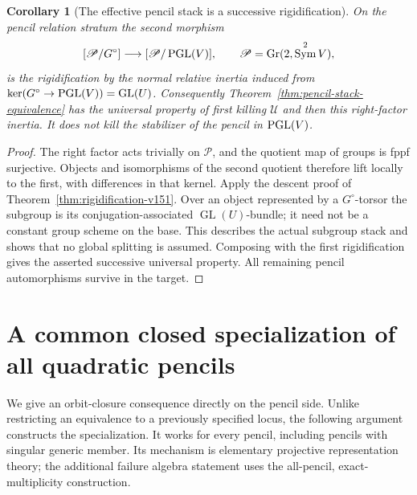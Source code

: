 \documentclass[11pt,reqno]{amsart}
\numberwithin{equation}{section}
\newtheorem{corollary}[theorem]{Corollary}
\theoremstyle{definition}\newtheorem{definition}[theorem]{Definition}
\theoremstyle{remark}\newtheorem{remark}[theorem]{Remark}
\DeclareMathOperator{\Sym}{Sym}\DeclareMathOperator{\Gr}{Gr}
\begin{document}
\begin{corollary}[The effective pencil stack is a successive rigidification]
\label{cor:two-rigidifications-v151}
On the pencil relation stratum the second morphism
\[
 [\mathscr P/G^\circ]\longrightarrow[\mathscr P/\PGL(V)],
                     \qquad \mathscr P=\Gr(2,\Sym^2V),
\]
is the rigidification by the normal relative inertia induced from
\(\ker(G^\circ\to\operatorname{PGL}(V))=\operatorname{GL}(U)\).
Consequently Theorem~\ref{thm:pencil-stack-equivalence} has the
universal property of first killing \(\mathscr U\) and then this
right-factor inertia.  It does not kill the stabilizer of the pencil
in \(\operatorname{PGL}(V)\).
\end{corollary}
\begin{proof}
The right factor acts trivially on \(\mathscr P\), and the quotient
map of groups is fppf surjective.  Objects and isomorphisms of the
second quotient therefore lift locally to the first, with differences
in that kernel.  Apply the descent proof of
Theorem~\ref{thm:rigidification-v151}.  Over an object represented by
a \(G^\circ\)-torsor the subgroup is its conjugation-associated
\(\operatorname{GL}(U)\)-bundle; it need not be a constant group
scheme on the base.  This describes the actual subgroup stack and
shows that no global splitting is assumed.  Composing with the first
rigidification gives the asserted successive universal property.
All remaining pencil automorphisms survive in the target.
\end{proof}


\section{A common closed specialization of all quadratic pencils}
\label{sec:closed-pencil-v151}

We give an orbit-closure consequence directly on the pencil side.
Unlike restricting an equivalence to a previously specified locus, the
following argument constructs the specialization.  It works for every
pencil, including pencils with singular generic member.  Its mechanism
is elementary projective representation theory; the additional failure
algebra statement uses the all-pencil, exact-multiplicity construction.
\end{document}
